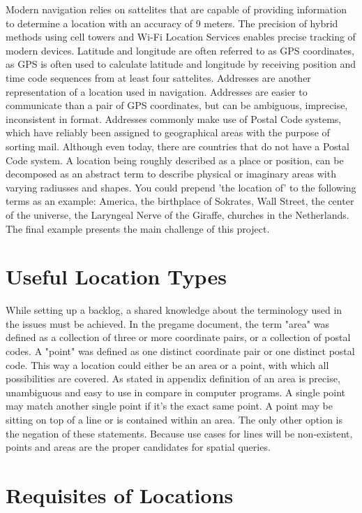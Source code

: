 Modern navigation relies on sattelites that are capable of providing information to determine a location with an accuracy of 9 meters. The precision of hybrid methods using cell towers and Wi-Fi Location Services enables precise tracking of modern devices. Latitude and longitude are often referred to as GPS coordinates, as GPS is often used to calculate latitude and longitude by receiving position and time code sequences from at least four sattelites. Addresses are another representation of a location used in navigation. Addresses are easier to communicate than a pair of GPS coordinates, but can be ambiguous, imprecise, inconsistent in format. Addresses commonly make use of Postal Code systems, which have reliably been assigned to geographical areas with the purpose of sorting mail. Although even today, there are countries that do not have a Postal Code system.
A location being roughly described as a place or position, can be decomposed as an abstract term to describe physical or imaginary areas with varying radiusses and shapes. You could prepend 'the location of' to the following terms as an example: America, the birthplace of Sokrates, Wall Street, the center of the universe, the Laryngeal Nerve of the Giraffe, churches in the Netherlands. The final example presents the main challenge of this project.

\section{Useful Location Types}

While setting up a backlog, a shared knowledge about the terminology used in the issues must be achieved. In the pregame document, the term "area" was defined as a collection of three or more coordinate pairs, or a collection of postal codes. A "point" was defined as one distinct coordinate pair or one distinct postal code. This way a location could either be an area or a point, with which all possibilities are covered. As stated in appendix  definition of an area is precise, unambiguous and easy to use in compare in computer programs. A single point may match another single point if it’s the exact same point. A point may be sitting on top of a line or is contained within an area. The only other option is the negation of these statements. Because use cases for lines will be non-existent, points and areas are the proper candidates for spatial queries.

\section{Requisites of Locations}

